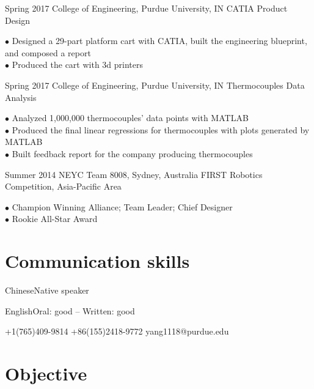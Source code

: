 \documentclass{tccv}
\begin{document}
\begin{eventlist}

\item{Spring 2017}
     {College of Engineering, Purdue University, IN}
     {CATIA Product Design}
     
$\bullet$ Designed a 29-part platform cart with CATIA, built the engineering blueprint, and composed a report\\
$\bullet$ Produced the cart with 3d printers

\item{Spring 2017}
     {College of Engineering, Purdue University, IN}
     {Thermocouples Data Analysis}

$\bullet$ Analyzed 1,000,000 thermocouples’ data points with MATLAB\\
$\bullet$ Produced the final linear regressions for thermocouples with plots generated by MATLAB\\
$\bullet$ Built feedback report for the company producing thermocouples

\item{Summer 2014}
     {NEYC Team 8008, Sydney, Australia}
     {FIRST Robotics Competition, Asia-Pacific Area}
     
$\bullet$ Champion Winning Alliance; Team Leader; Chief Designer\\
$\bullet$ Rookie All-Star Award

\section{Communication skills}

\begin{factlist}
\item{Chinese}{Native speaker}
\item{English}{Oral: good -- Written: good}
\end{factlist}

\end{eventlist}

    {+1(765)409-9814 \newline +86(155)2418-9772}
    {yang1118@purdue.edu}
    
\section{Objective}
\end{document}
